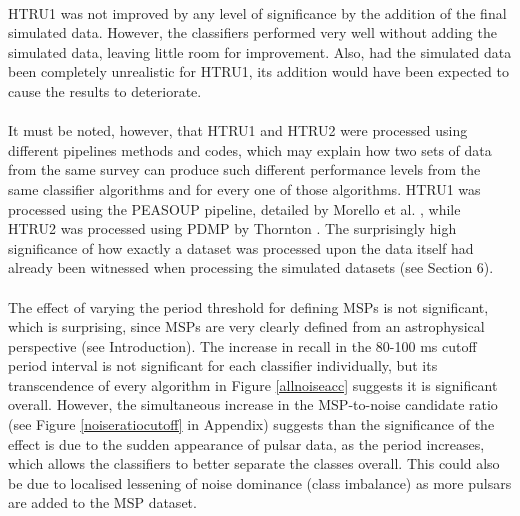\documentclass[12pt]{article}
\begin{document}
\paragraph{}
HTRU1 was not improved by any level of significance by the addition of the final simulated data. However, the classifiers performed very well without adding the simulated data, leaving little room for improvement. Also, had the simulated data been completely unrealistic for HTRU1, its addition would have been expected to cause the results to deteriorate.
\paragraph{}
It must be noted, however, that HTRU1 and HTRU2 were processed using different pipelines methods and codes, which may explain how two sets of data from the same survey can produce such different performance levels from the same classifier algorithms and for every one of those algorithms. HTRU1 was processed using the PEASOUP pipeline, detailed by Morello et al. \cite{morello2014spinn}, while HTRU2 was processed using PDMP by Thornton \cite{thornton2013high}. The surprisingly high significance of how exactly a dataset was processed upon the data itself had already been witnessed when processing the simulated datasets (see Section 6).
\paragraph{}
The effect of varying the period threshold for defining MSPs is not significant, which is surprising, since MSPs are very clearly defined from an astrophysical perspective (see Introduction). The increase in recall in the 80-100 ms cutoff period interval is not significant for each classifier individually, but its transcendence of every algorithm in Figure \ref{allnoiseacc} suggests it is significant overall. However, the simultaneous increase in the MSP-to-noise candidate ratio (see Figure \ref{noiseratiocutoff} in Appendix) suggests than the significance of the effect is due to the sudden appearance of pulsar data, as the period increases, which allows the classifiers to better separate the classes overall. This could also be due to localised lessening of noise dominance (class imbalance) as more pulsars are added to the MSP dataset.
\end{document}
